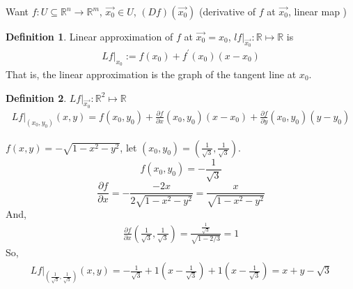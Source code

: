\documentclass[12pt]{book}
\theoremstyle{definition}
\newtheorem{definition}{Definition}[section]
\theoremstyle{remark}
\begin{document}
  Want $f: U \subseteq \mathbb{R}^n \rightarrow \mathbb{R}^m$, $\vec{{x_0}} \in U $, $(Df)(\vec{{x_0}})$ (derivative of $f$ at $\vec{{x_0}}$, linear map )
  \newline
  \begin{definition}Linear approximation of $f$ at $\vec{{x_0}}  =x_0$, $ \left. lf \right|_{\vec{{x_0}}} : \mathbb{R}\mapsto \mathbb{R}$ is  
    \begin{equation*}
      \begin{split}
        \left. Lf \right|_{x_0} := f(x_0) + f^\prime (x_0)(x-x_0)
      \end{split}
    \end{equation*}
    That is, the linear approximation is the graph of the tangent line at $x_0$.
    
  \end{definition}
  \begin{definition}$ \left. Lf \right|_{\vec{{x_0}}}: \mathbb{R}^2 \mapsto \mathbb{R} $
    \begin{equation*}
      \begin{split}
        \left. Lf \right|_{(x_0, y_0)} (x,y) = f(x_0,y_0) + \frac{\partial f}{\partial x} (x_0, y_0) (x-x_0) + \frac{\partial f}{\partial y} (x_0, y_0) (y-y_0) 
      \end{split}
    \end{equation*}
    
  \end{definition}
  \begin{example}$f(x,y) = -\sqrt{1-x^2-y^2}$, let $(x_0, y_0) = (\frac{1}{\sqrt{3}}, \frac{1}{\sqrt{3}})$. 
   \newline 
    $$f(x_0, y_0) = -\frac{1}{\sqrt{3}}  $$
    $$\frac{\partial f}{\partial x} =- \frac{-2x}{2\sqrt{1-x^2 -y^2}} = \frac{x}{\sqrt{1-x^2-y^2}}   $$
    And, 
    \begin{equation*}
      \begin{split}
        \frac{\partial f}{\partial x} \left( \frac{1}{\sqrt{3}} , \frac{1}{\sqrt{3}}  \right) = \frac{\frac{1}{\sqrt{3}} }{\sqrt{1 - 2/3}} = 1 
      \end{split}
    \end{equation*}
    So, 
    \begin{equation*}
      \begin{split}
        \left. Lf \right|_{( \frac{1}{\sqrt{3}} , \frac{1}{\sqrt{3}} )} (x,y) = -\frac{1}{\sqrt{3}}+ 1(x - \frac{1}{\sqrt{3}} ) +1(x - \frac{1}{\sqrt{3}} )= x+y- \sqrt{3} 
      \end{split}
    \end{equation*}
  \end{example}
\end{document}
